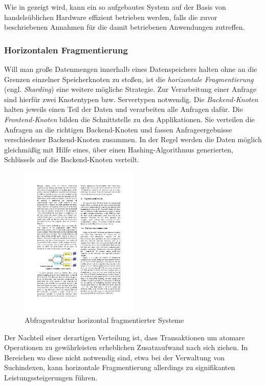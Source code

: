 Wie in  \citep{ghemawat03}  gezeigt wird, kann ein so aufgebautes System auf der Basis von handelsüblichen Hardware effizient betrieben werden, falls die zuvor beschriebenen Annahmen für die damit betriebenen Anwendungen zutreffen.  \citep{ghemawat03}

\subsubsection{Horizontalen Fragmentierung}

Will man große Datenmengen innerhalb eines Datenspeichers halten ohne an die Grenzen einzelner Speicherknoten zu stoßen, ist die \textit{horizontale Fragmentierung} (engl. \textit{Sharding}) eine weitere mögliche Strategie. Zur Verarbeitung einer Anfrage sind hierfür zwei Knotentypen bzw. Servertypen notwendig. Die \textit{Backend-Knoten} halten jeweils einen Teil der Daten und verarbeiten alle Anfragen dafür. Die \textit{Frontend-Knoten} bilden die Schnittstelle zu den Applikationen. Sie verteilen die Anfragen an die richtigen Backend-Knoten und fassen Anfrageergebnisse verschiedener Backend-Knoten zusammen. In der Regel werden die Daten möglich gleichmäßig mit Hilfe eines, über einen Hashing-Algorithmus generierten, Schlüssels auf die Backend-Knoten verteilt. \citep{Michael07}
\begin{figure}[H]
  \centering
    \includegraphics[width=0.5\textwidth]{Abbildungen/sharding}
    \caption[Horizonale Fragmentierung]{\footnotesize Abfragestruktur horizontal fragmentierter Systeme {\footnotemark} }
    \label{fig:sharding}
\end{figure}

Der Nachteil einer derartigen Verteilung ist, dass Transaktionen um atomare Operationen zu gewährleisten erheblichen Zusatzaufwand nach sich ziehen. In Bereichen wo diese nicht notwendig sind, etwa bei der Verwaltung von Suchindexen, kann horizontale Fragmentierung allerdings zu signifikanten Leistungssteigerungen führen. \citep{Michael07}

